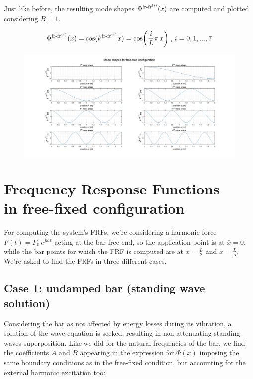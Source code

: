 \documentclass[a4paper,12pt,oneside]{article}
\begin{document}
Just like before, the resulting mode shapes $ \Phi^{\textup{fr-fr}^{(i)}}(x) $ are computed and plotted considering $ B = 1 $.

\[
	\Phi^{\textup{fr-fr}^{(i)}}(x) = \cos(k^{\textup{fr-fr}^{(i)}} x) = %
		\cos\biggl(\frac{i}{L} \pi \, x\biggr) ~ \text{,} ~ i = 0,1,...,7
\]

\begin{figure}[h]
	\hspace{-70pt}
	\includegraphics[scale=0.4]{mode_shapes_free_free}
\end{figure}


\section{Frequency Response Functions \\ in free-fixed configuration}
\label{sec:frfs}

For computing the system's FRFs, we're considering a harmonic force $ F(t) = F_0 \, e^{j \omega \, t} $ acting at the bar free end, so the application point is at $ \bar{x} = 0 $, while the bar points for which the FRF is computed are at $ \bar{x} = \frac{L}{2} $ and $ \bar{x} = \frac{L}{5} $. We're asked to find the FRFs in three different cases.

\subsection*{Case 1: undamped bar (standing wave solution)}

Considering the bar as not affected by energy losses during its vibration, a solution of the wave equation is seeked, resulting in non-attenuating standing waves superposition. Like we did for the natural frequencies of the bar, we find the coefficients $ A $ and $ B $ appearing in the expression for $ \Phi(x) $ imposing the same boundary conditions as in the free-fixed condition, but accounting for the external harmonic excitation too:
\end{document}
